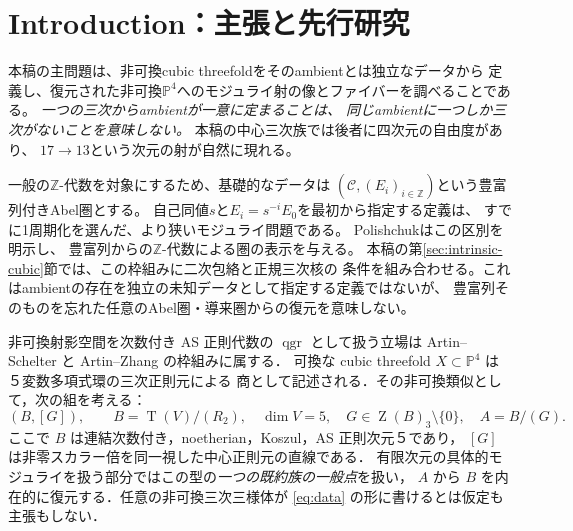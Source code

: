 \documentclass[11pt,a4paper]{ltjsarticle}
\numberwithin{equation}{section}
\newcommand{\PP}{\mathbb P}
\newcommand{\qgr}{\operatorname{qgr}}
\newcommand{\Z}{\operatorname{Z}}
\newcommand{\Tens}{\operatorname{T}}
\begin{document}
\section{Introduction：主張と先行研究}\label{sec:intro}
本稿の主問題は、非可換cubic threefoldをそのambientとは独立なデータから
定義し、復元された非可換$\PP^4$へのモジュライ射の像とファイバーを調べることである。
\emph{一つの三次からambientが一意に定まることは、
同じambientに一つしか三次がないことを意味しない。}
本稿の中心三次族では後者に四次元の自由度があり、
$17\longrightarrow13$という次元の射が自然に現れる。

一般の$\mathbb Z$-代数を対象にするため、基礎的なデータは
$(\mathcal C,(E_i)_{i\in\mathbb Z})$という豊富列付きAbel圏とする。
自己同値$s$と$E_i=s^{-i}E_0$を最初から指定する定義は、
すでに1周期化を選んだ、より狭いモジュライ問題である。
Polishchuk\cite[Theorem 2.4 and Remarks 2]{PolishchukProj}はこの区別を明示し、
豊富列からの$\mathbb Z$-代数による圏の表示を与える。
本稿の第\ref{sec:intrinsic-cubic}節では、この枠組みに二次包絡と正規三次核の
条件を組み合わせる。これはambientの存在を独立の未知データとして指定する定義ではないが、
豊富列そのものを忘れた任意のAbel圏・導来圏からの復元を意味しない。

非可換射影空間を次数付き AS 正則代数の $\qgr$ として扱う立場は
Artin--Schelter \cite{AS} と Artin--Zhang \cite{AZ} の枠組みに属する．
可換な cubic threefold $X\subset\PP^4$ は５変数多項式環の三次正則元による
商として記述される．その非可換類似として，次の組を考える：
\begin{equation}\label{eq:data}
 (B,[G]),\qquad B=\Tens(V)/(R_2),\quad\dim V=5,\quad
 G\in\Z(B)_3\setminus\{0\},\quad A=B/(G).
\end{equation}
ここで $B$ は連結次数付き，noetherian，Koszul，AS 正則次元５であり，
$[G]$ は非零スカラー倍を同一視した中心正則元の直線である．
有限次元の具体的モジュライを扱う部分ではこの型の\emph{一つの既約族の一般点}を扱い，
$A$ から $B$ を内在的に復元する．任意の非可換三次三様体が
\eqref{eq:data} の形に書けるとは仮定も主張もしない．
\end{document}
